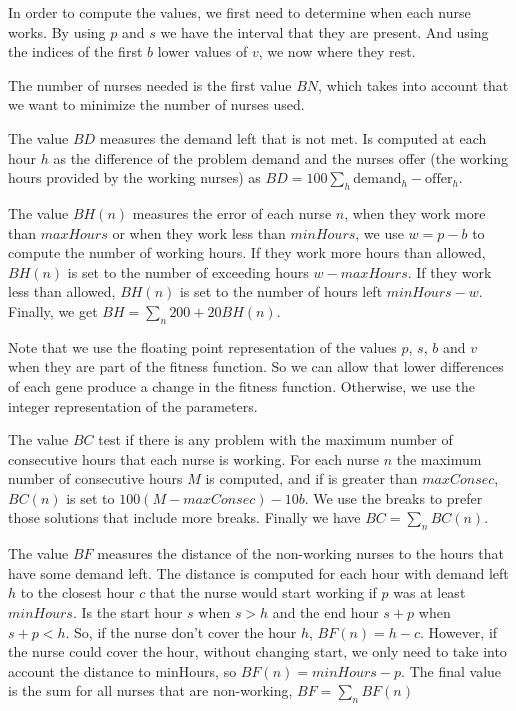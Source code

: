 \documentclass[12pt,a4paper]{article}
\begin{document}
In order to compute the values, we first need to determine when each nurse 
works. By using $p$ and $s$ we have the interval that they are present.  And 
using the indices of the first $b$ lower values of $v$, we now where they rest.

The number of nurses needed is the first value $BN$, which takes into account 
that we want to minimize the number of nurses used.

The value $BD$ measures the demand left that is not met. Is computed at each 
hour $h$ as the difference of the problem demand and the nurses offer (the 
working hours provided by the working nurses) as $BD = 100 \sum_h 
\textrm{demand}_h - \textrm{offer}_h$.

The value $BH(n)$ measures the error of each nurse $n$, when they work more than 
$maxHours$ or when they work less than $minHours$, we use $w = p - b$ to compute 
the number of working hours. If they work more hours than allowed, $BH(n)$ is 
set to the number of exceeding hours $w - maxHours$. If they work less than 
allowed, $BH(n)$ is set to the number of hours left $minHours - w$.  Finally, we 
get $BH = \sum_n 200 + 20 BH(n)$.

Note that we use the floating point representation of the values $p$, $s$, $b$ 
and $v$ when they are part of the fitness function. So we can allow that lower 
differences of each gene produce a change in the fitness function. Otherwise, we 
use the integer representation of the parameters.

The value $BC$ test if there is any problem with the maximum number of 
consecutive hours that each nurse is working. For each nurse $n$ the maximum 
number of consecutive hours $M$ is computed, and if is greater than $maxConsec$, 
$BC(n)$ is set to $100(M - maxConsec) - 10b$. We use the breaks to prefer those 
solutions that include more breaks. Finally we have $BC = \sum_n BC(n)$.

The value $BF$ measures the distance of the non-working nurses to the hours that 
have some demand left. The distance is computed for each hour with demand left 
$h$ to the closest hour $c$ that the nurse would start working if $p$ was at 
least $minHours$. Is the start hour $s$ when $s > h$ and the end hour $s+p$ when 
$s+p < h$. So, if the nurse don't cover the hour $h$, $BF(n) = h - c$. However, 
if the nurse could cover the hour, without changing start, we only need to take 
into account the distance to minHours, so $BF(n) = minHours - p$. The final 
value is the sum for all nurses that are non-working, $BF = \sum_n BF(n)$
\end{document}
